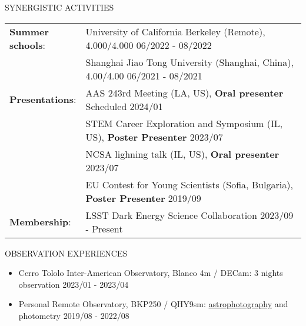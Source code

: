 \documentclass[10pt]{article} %
\begin{document}
\begin{section}{SYNERGISTIC ACTIVITIES}

\begin{tabular}{@{}p{0.2\linewidth}@{}p{0.8\linewidth}@{}}
    \textbf{Summer schools}: & University of California Berkeley (Remote), 4.000/4.000  \hfill 06/2022 - 08/2022\\
    & Shanghai Jiao Tong University (Shanghai, China), 4.00/4.00 \hfill 06/2021 - 08/2021\\
    \textbf{Presentations}: & AAS 243rd Meeting (LA, US), \textbf{Oral presenter} \hfill Scheduled 2024/01  \\
    & STEM Career Exploration and Symposium (IL, US), \textbf{Poster Presenter} \hfill 2023/07  \\
    & NCSA lighning talk (IL, US), \textbf{Oral presenter} \hfill 2023/07 \\
    & EU Contest for Young Scientists (Sofia, Bulgaria), \textbf{Poster Presenter} \hfill 2019/09 \\
    \textbf{Membership}: &LSST Dark Energy Science Collaboration \hfill 2023/09 - Present \\
\end{tabular}

\end{section}

\begin{section}{OBSERVATION EXPERIENCES}
    
\begin{itemize}[leftmargin=1.5em]
    \item Cerro Tololo Inter-American Observatory, Blanco 4m / DECam: 3 nights observation \hfill 2023/01 - 2023/04
    \item Personal Remote Observatory, BKP250 / QHY9sm: \href{https://yliu.fit/astrophotography/}{astrophotography} and photometry \hfill 2019/08 - 2022/08
\end{itemize}

\end{section}
\end{document}
